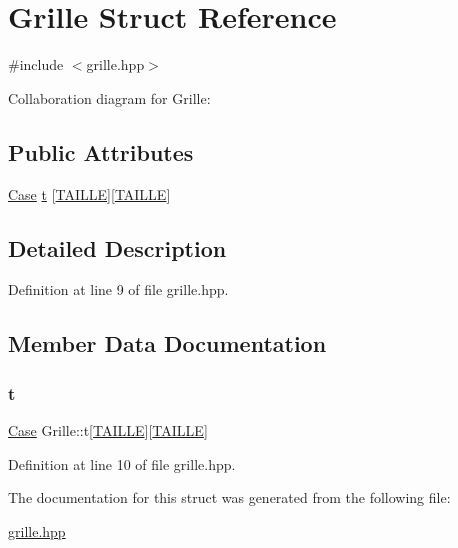 \hypertarget{structGrille}{}\section{Grille Struct Reference}
\label{structGrille}


{\ttfamily \#include $<$grille.\+hpp$>$}



Collaboration diagram for Grille\+:
\subsection*{Public Attributes}
\begin{DoxyCompactItemize}
\item 
\hyperlink{structCase}{Case} \hyperlink{structGrille_a602de7a542de44694f1465aa6a12ea3d}{t} \mbox{[}\hyperlink{grille_8hpp_a3af25ad4074904b83ee7cca27a822751}{T\+A\+I\+L\+LE}\mbox{]}\mbox{[}\hyperlink{grille_8hpp_a3af25ad4074904b83ee7cca27a822751}{T\+A\+I\+L\+LE}\mbox{]}
\end{DoxyCompactItemize}


\subsection{Detailed Description}


Definition at line 9 of file grille.\+hpp.



\subsection{Member Data Documentation}
\mbox{\label{structGrille_a602de7a542de44694f1465aa6a12ea3d}} 
\subsubsection{\texorpdfstring{t}{t}}
{\footnotesize\ttfamily \hyperlink{structCase}{Case} Grille\+::t\mbox{[}\hyperlink{grille_8hpp_a3af25ad4074904b83ee7cca27a822751}{T\+A\+I\+L\+LE}\mbox{]}\mbox{[}\hyperlink{grille_8hpp_a3af25ad4074904b83ee7cca27a822751}{T\+A\+I\+L\+LE}\mbox{]}}



Definition at line 10 of file grille.\+hpp.



The documentation for this struct was generated from the following file\+:\begin{DoxyCompactItemize}
\item 
\hyperlink{grille_8hpp}{grille.\+hpp}\end{DoxyCompactItemize}
